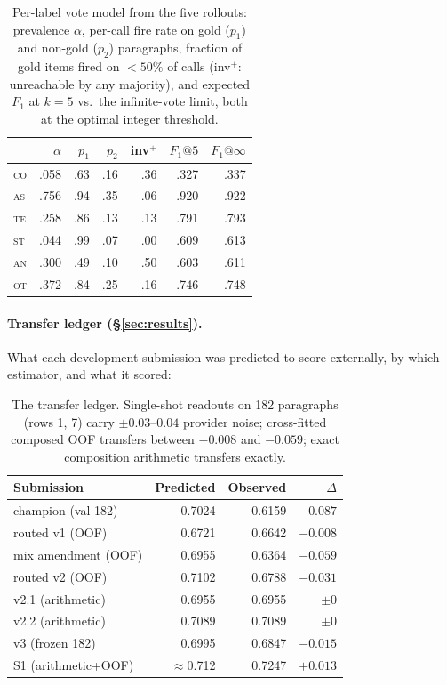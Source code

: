 \documentclass[11pt]{article}
\newcommand{\lab}[1]{\textsc{#1}}
\newcommand{\co}{\lab{co}}
\newcommand{\as}{\lab{as}}
\newcommand{\te}{\lab{te}}
\newcommand{\st}{\lab{st}}
\newcommand{\an}{\lab{an}}
\newcommand{\ot}{\lab{ot}}
\begin{document}
\begin{table}[h]
\centering\scriptsize
\setlength{\tabcolsep}{4pt}
\begin{tabular}{lrrrrrr}
\toprule
 & $\alpha$ & $p_1$ & $p_2$ & inv$^{+}$ & $F_1@5$ & $F_1@\infty$ \\
\midrule
\co & .058 & .63 & .16 & .36 & .327 & .337 \\
\as & .756 & .94 & .35 & .06 & .920 & .922 \\
\te & .258 & .86 & .13 & .13 & .791 & .793 \\
\st & .044 & .99 & .07 & .00 & .609 & .613 \\
\an & .300 & .49 & .10 & .50 & .603 & .611 \\
\ot & .372 & .84 & .25 & .16 & .746 & .748 \\
\bottomrule
\end{tabular}
\caption{Per-label vote model from the five rollouts: prevalence
$\alpha$, per-call fire rate on gold ($p_1$) and non-gold ($p_2$)
paragraphs, fraction of gold items fired on ${<}50\%$ of calls
(inv$^{+}$: unreachable by any majority), and expected $F_1$ at $k{=}5$
vs.\ the infinite-vote limit, both at the optimal integer threshold.}
\label{tab:votes}
\end{table}

\paragraph{Transfer ledger (\S\ref{sec:results}).} What each development
submission was predicted to score externally, by which estimator, and
what it scored:

\begin{table}[h]
\centering\scriptsize
\begin{tabular}{lrrr}
\toprule
Submission & Predicted & Observed & $\Delta$ \\
\midrule
champion (val 182) & 0.7024 & 0.6159 & $-0.087$ \\
routed v1 (OOF) & 0.6721 & 0.6642 & $-0.008$ \\
mix amendment (OOF) & 0.6955 & 0.6364 & $-0.059$ \\
routed v2 (OOF) & 0.7102 & 0.6788 & $-0.031$ \\
v2.1 (arithmetic) & 0.6955 & 0.6955 & $\pm 0$ \\
v2.2 (arithmetic) & 0.7089 & 0.7089 & $\pm 0$ \\
v3 (frozen 182) & 0.6995 & 0.6847 & $-0.015$ \\
S1 (arithmetic+OOF) & $\approx$0.712 & 0.7247 & $+0.013$ \\
\bottomrule
\end{tabular}
\caption{The transfer ledger. Single-shot readouts on 182 paragraphs
(rows 1, 7) carry $\pm 0.03$--$0.04$ provider noise; cross-fitted
composed OOF transfers between $-0.008$ and $-0.059$; exact composition
arithmetic transfers exactly.}
\label{tab:transfer}
\end{table}
\end{document}
